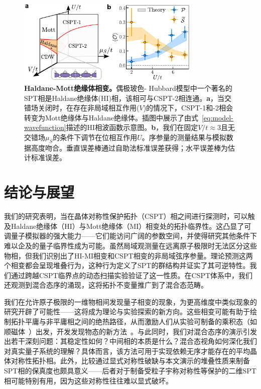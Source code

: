 \documentclass[preprint,superscriptaddress,floatfix, nofootinbib]{revtex4-2}
\begin{document}
\begin{CJK*}{UTF8}{gbsn}
\begin{figure}
    \centering
    \includegraphics[width=247pt]{figures/Fig_Haldane_V3.pdf}
    \caption{\textbf{Haldane-Mott绝缘体相变。}偶极玻色- Hubbard模型中一个著名的SPT相是Haldane绝缘体(HI)相，该相可与CSPT-2相连通。\textbf{a}，当交错场关闭时，在存在非局域相互作用($V$)的情况下，CSPT-1和-2相会转变为Mott绝缘体与Haldane绝缘体。插图中展示了由式~\eqref{eq:model-wavefunction}描述的HI相波函数示意图。\textbf{b}，我们在固定$V/t\approx3$且无交错场$\mu_S$的条件下调节在位相互作用$U$。序参量的测量结果与模拟数据高度吻合。垂直误差棒通过自助法标准误差获得；水平误差棒为估计标准误差。}
    \label{fig: HI}
\end{figure}
\section{结论与展望}

我们的研究表明，当在晶体对称性保护拓扑（CSPT）相之间进行探测时，可以触及Haldane绝缘体（HI）与Mott绝缘体（MI）相变处的拓扑临界性。这凸显了可调量子模拟器的强大能力——它们能访问广阔的参数空间，并使得研究其他条件下难以企及的量子临界性成为可能。虽然局域观测量在远离原子极限时无法区分这些物相，但我们识别出了HI-MI相变和CSPT相变的非局域弦序参量。理论预测这两个相变都会呈现堆叠行为，这种行为定义了SPT的群结构并证实了其可逆特性。我们通过跨越CSPT临界点的动态扫描实验验证了这一性质。在CSPT体系中，我们还观测到混合态序的涌现，这将拓扑不变量推广到了混合态范畴。

我们在允许原子极限的一维物相间发现量子相变的现象，为更高维度中类似现象的研究开辟了可能性——这将成为理论与实验探索的新方向。这些相变可能有助于绘制拓扑平庸与非平庸相之间的绝热路径，从而激励人们从实验可制备的乘积态（如顺磁体~\cite{Scholl2021, Ebadi2021}）出发，开发发现物态的新方法~\cite{Semeghini2021}。与此同时，我们对混合态序的演示引发出若干深刻问题：其稳定性如何？中间相的本质是什么？混合态视角如何深化我们对真实量子系统的理解？具体而言，该方法可用于实现依赖无序才能存在的平均晶体对称性拓扑相\cite{Ma23_b,intrinsicACSPT}。此外，比较通过显式对称性破缺与本文演示的堆叠性质来制备SPT相的保真度也颇具意义——后者对于制备受粒子宇称对称性等保护的二维SPT相可能特别有用\cite{LevinGu}，因为这些对称性往往难以显式破坏。


\end{CJK*}
\end{document}
